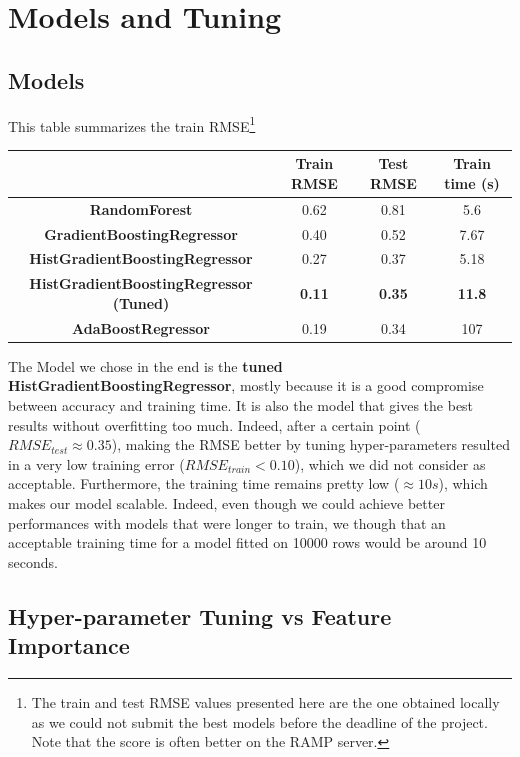 \documentclass[a4paper,12pt,twoside]{article}
\begin{document}
\section{Models and Tuning}
\subsection{Models}

This table summarizes the train RMSE\footnote{The train and test RMSE values presented here are the one obtained locally as we could not submit the best models before the deadline of the project. Note that the score is often better on the RAMP server.} 

\begin{center}
	\begin{tabular}{| c | c | c | c |} 
		\hline
			 & Train RMSE & Test RMSE & Train time (s) \\ [0.5ex] 
		\hline
		\textbf{RandomForest} & 0.62 & 0.81 & 5.6 \\ 
		\hline
		\textbf{GradientBoostingRegressor} & 0.40 & 0.52 & 7.67 \\
		\hline
		\textbf{HistGradientBoostingRegressor} & 0.27 & 0.37 & 5.18 \\
		\hline
		\textbf{HistGradientBoostingRegressor (Tuned)} & \textbf{0.11} & \textbf{0.35} & \textbf{11.8} \\
		\hline
		\textbf{AdaBoostRegressor} & 0.19 & 0.34 & 107 \\
		\hline
	\end{tabular}
\end{center}


The Model we chose in the end is the \textbf{tuned HistGradientBoostingRegressor}, mostly because it is a good compromise between accuracy and training time. It is also the model that gives the best results without overfitting too much. Indeed, after a certain point ($RMSE_{test} \approx 0.35$), making the RMSE better by tuning hyper-parameters resulted in a very low training error ($RMSE_{train} < 0.10$), which we did not consider as acceptable.
Furthermore, the training time remains pretty low ($\approx 10 s$), which makes our model scalable. Indeed, even though we could achieve better performances with models that were longer to train, we though that an acceptable training time for a model fitted on 10000 rows would be around 10 seconds.

\subsection{Hyper-parameter Tuning vs Feature Importance}
\end{document}
